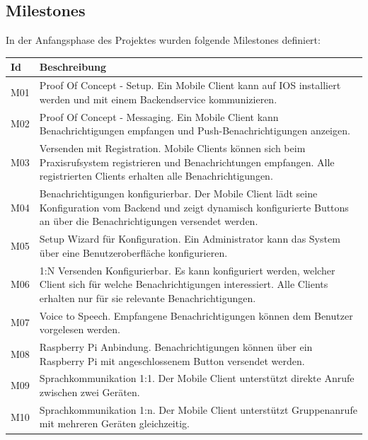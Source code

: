 \clearpage
\subsection{Milestones}

In der Anfangsphase des Projektes wurden folgende Milestones definiert:

\begin{table}[h]
    \centering
    \begin{tabular}{|l|p{15cm}|}
        \hline
        \textbf{Id} & \textbf{Beschreibung}                                                                                                                                                                                         \\
        \hline
        M01         & Proof Of Concept - Setup. Ein Mobile Client kann auf IOS installiert werden und mit einem Backendservice kommunizieren. \\
        \hline
        M02         & Proof Of Concept - Messaging. Ein Mobile Client kann Benachrichtigungen empfangen und Push-Benachrichtigungen anzeigen. \\
        \hline
        M03         & Versenden mit Registration. Mobile Clients können sich beim Praxisrufsystem registrieren und Benachrichtungen empfangen. Alle registrierten Clients erhalten alle Benachrichtigungen. \\
        \hline
        M04         & Benachrichtigungen konfigurierbar. Der Mobile Client lädt seine Konfiguration vom Backend und zeigt dynamisch konfigurierte Buttons an über die Benachrichtigungen versendet werden.\\
        \hline
        M05         & Setup Wizard für Konfiguration. Ein Administrator kann das System über eine Benutzeroberfläche konfigurieren.  \\
        \hline
        M06         & 1:N Versenden Konfigurierbar. Es kann konfiguriert werden, welcher Client sich für welche Benachrichtigungen interessiert. Alle Clients erhalten nur für sie relevante Benachrichtigungen.  \\
        \hline
        M07         & Voice to Speech. Empfangene Benachrichtigungen können dem Benutzer vorgelesen werden. \\
        \hline
        M08         & Raspberry Pi Anbindung. Benachrichtigungen können über ein Raspberry Pi mit angeschlossenem Button versendet werden. \\
        \hline
        M09         & Sprachkommunikation 1:1. Der Mobile Client unterstützt direkte Anrufe zwischen zwei Geräten. \\
        \hline
        M10         & Sprachkommunikation 1:n. Der Mobile Client unterstützt Gruppenanrufe mit mehreren Geräten gleichzeitig. \\
        \hline
    \end{tabular}\label{tab:milestones}
\end{table}
\clearpage


